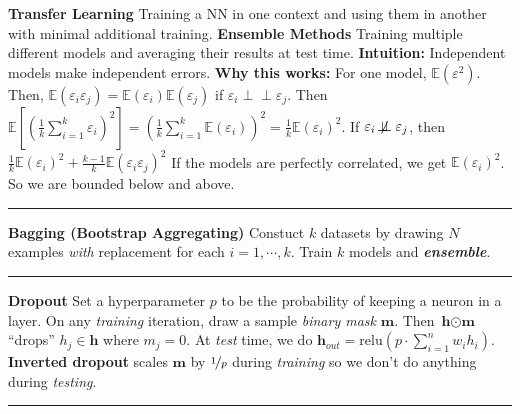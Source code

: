\documentclass{article}
\newcommand{\E}{\mathbb{E}}
\newcommand{\h}{\bf{h}}
\newcommand{\m}{\bf{m}}
\renewcommand{\bf}[1]{\textbf{{#1}}}
\renewcommand{\it}[1]{\textit{{#1}}}
\newcommand{\ib}[1]{\textit{\textbf{{#1}}}}
\newcommand{\relu}{\text{relu}}
\newcommand{\eps}{\varepsilon}
\begin{document}
\begin{small}
\bf{Transfer Learning}
\newline
Training a NN in one context and using them in another with minimal additional training.
\newline
\bf{Ensemble Methods}
\newline
Training multiple different models and averaging their results at test time.
\newline
\bf{Intuition:} Independent models make independent errors.
\newline
\bf{Why this works:}
For one model, $\E(\eps^2)$. Then, 
$\E(\eps_i \eps_j) = \E(\eps_i) \E(\eps_j)$ if $\eps_i \perp \!\!\! \perp \eps_j$. Then
$
\E\left[ \left( \frac{1}{k} \sum_{i = 1}^{k} \eps_i \right)^2 \right]
=
\left( \frac{1}{k} \sum_{i = 1}^{k} \E(\eps_i) \right)^2
=
\frac{1}{k} \E(\eps_i)^2
$.
If $\eps_i \not \! \perp \!\!\! \perp \eps_j$, then 
$\frac{1}{k} \E(\eps_i)^2 + \frac{k - 1}{k} \E(\eps_i \eps_j)^2$
If the models are perfectly correlated, we get $\E(\eps_i)^2$. So we are bounded below and above.
\vspace{0.1em}

\hrule
\vspace{0.1em}
\bf{Bagging (Bootstrap Aggregating)}
\newline
Constuct $k$ datasets by drawing $N$ examples \it{with} replacement for each $i = 1, \cdots, k$.
Train $k$ models and \ib{ensemble}.
\vspace{0.1em}

\hrule
\vspace{0.1em}
\bf{Dropout}
Set a hyperparameter $p$ to be the probability of keeping a neuron in a layer. On any \it{training} 
iteration, draw a sample \it{binary mask} $\m$. Then $\h \odot \m$ ``drops'' $h_j \in \h$ where $m_j = 0$.
At \it{test} time, we do $\h_{\it{out}} = \relu\left( p \cdot \sum_{i = 1}^{n} w_i h_i \right)$.
\newline
\bf{Inverted dropout} scales $\m$ by $\nicefrac{1}{p}$ during \it{training} so we don't do anything 
during \it{testing}.
\vspace{0.1em}

\hrule
\vspace{0.1em}


\end{small}
\end{document}
